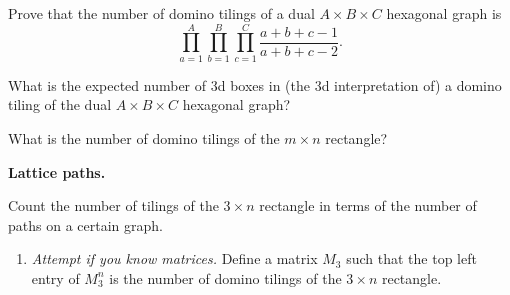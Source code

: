\documentclass[11pt,fleqn]{book} %
\begin{document}
\begin{problem}
Prove that the number of domino tilings of a dual $A \times B \times C$ hexagonal graph is 
$$\prod_{a=1}^A \prod_{b=1}^B \prod_{c=1}^C \frac{a+b+c-1}{a+b+c-2}.$$
\end{problem}


\begin{problem}
What is the expected number of 3d boxes in (the 3d interpretation of) a domino tiling of the dual $A\times B \times C$ hexagonal graph?
\end{problem}



\begin{problem}
What is the number of domino tilings of the $m\times n$ rectangle?
\end{problem}



\textbf{Lattice paths.}






\begin{problem}
Count the number of tilings of the $3\times n$ rectangle in terms of the number of paths on a certain graph. 
\begin{enumerate}[label=\alph*.]
\item \textit{Attempt if you know matrices.} Define a matrix $M_3$ such that the top left entry of $M_3^n$ is the number of domino tilings of the $3\times n$ rectangle.
\end{enumerate}
\end{problem}
\end{document}
